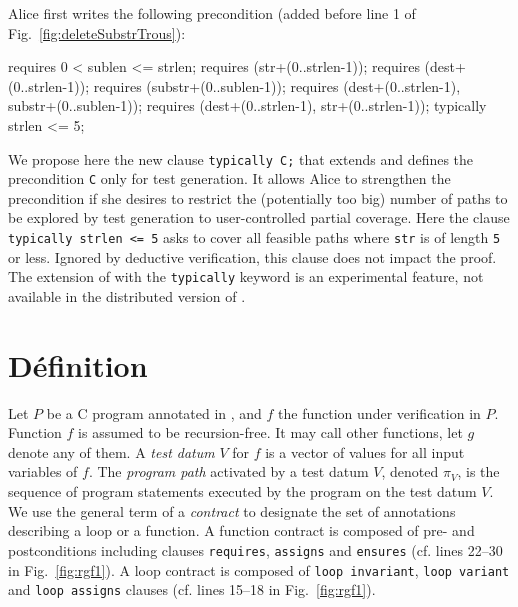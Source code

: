 Alice first writes the following precondition (added before line 1 of Fig.~\ref{fig:deleteSubstrTrous}):
\begin{pretty-codeACSL}
requires 0 < sublen <= strlen;
requires \valid(str+(0..strlen-1));
requires \valid(dest+(0..strlen-1));
requires \valid(substr+(0..sublen-1));
requires \separated(dest+(0..strlen-1), substr+(0..sublen-1));
requires \separated(dest+(0..strlen-1), str+(0..strlen-1));
typically strlen <= 5;
\end{pretty-codeACSL}
We propose here the new clause \lstinline{typically C;} that extends \eacsl
and defines the  precondition \lstinline{C} only for test generation.
It allows Alice to strengthen the precondition if she desires to 
restrict the (potentially too big) number of paths
to be explored by test generation to user-controlled partial coverage. 
Here the clause 
\lstinline{typically strlen <= 5} asks to cover all feasible
paths where \lstinline{str} is of length \lstinline{5} or less.
Ignored by deductive verification, this clause does not impact the proof.
The extension of \acsl with the \lstinline'typically' keyword is an
experimental feature, not available in the distributed version of \framac.


\section{Définition}
\label{sec:ncd-def}


Let $P$ be a C program annotated in \eacsl, 
and $f$ the function under verification in $P$.
Function $f$ is assumed to be recursion-free.
It may call other functions, let $g$ denote any of them.
A \emph{test datum} $V$ for $f$ is a vector of values for all input variables of $f$.
The \emph{program path} activated by a test datum $V$, denoted $\pi_V$,  is the sequence of program statements
executed by the program on the test datum $V$.
We use the general term of a \emph{contract} 
to designate the set of \eacsl annotations describing a loop or a function.
A function contract is composed of pre- and postconditions including \eacsl clauses
\lstinline{requires}, \lstinline{assigns} and
\lstinline{ensures}  (cf. lines 22--30 in Fig.~\ref{fig:rgf1}).
A loop contract is composed of \lstinline{loop invariant},
\lstinline{loop variant} and \lstinline{loop assigns} clauses
(cf. lines 15--18 in Fig.~\ref{fig:rgf1}).


